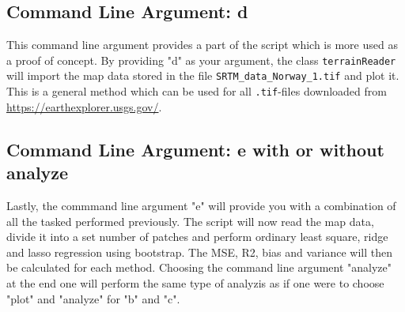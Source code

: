 \documentclass[12pt]{article}
\begin{document}
\subsection{Command Line Argument: d}
This command line argument provides a part of the script which is more used as a proof of concept. By providing "d" as your argument, the class \texttt{terrainReader} will import the map data stored in the file \texttt{SRTM\_data\_Norway\_1.tif} and plot it. This is a general method which can be used for all \texttt{.tif}-files downloaded from \url{https://earthexplorer.usgs.gov/}.
\subsection{Command Line Argument: e with or without analyze}
Lastly, the commmand line argument "e" will provide you with a combination of all the tasked performed previously. The script will now read the map data, divide it into a set number of patches and perform ordinary least square, ridge and lasso regression using bootstrap. The MSE, R2, bias and variance will then be calculated for each method. Choosing the command line argument "analyze" at the end one will perform the same type of analyzis as if one were to choose "plot" and "analyze" for "b" and "c".
\end{document}
